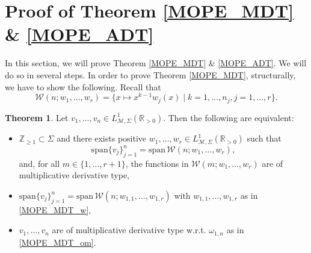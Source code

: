 \documentclass[a4paper,12pt,oneside]{article}
\theoremstyle{definition}
\newtheorem{thm}[defi]{Theorem}
\newcommand{\Z}{\mathbb{Z}}
\newcommand{\C}{\mathbb{C}}
\newcommand{\R}{\mathbb{R}}
\newcommand{\om}{\omega}
\newcommand{\spn}[1]{\text{span}\{#1\}}
\newcommand{\MT}[1]{\mathcal{M}#1}
\begin{document}
\section{Proof of Theorem \ref{MOPE_MDT} \& \ref{MOPE_ADT}} 

In this section, we will prove Theorem \ref{MOPE_MDT} \& \ref{MOPE_ADT}. We will do so in several steps. In order to prove Theorem \ref{MOPE_MDT}, structurally, we have to show the following. Recall that
    $$ \mathcal{W}(n;w_1,\dots,w_r) = \{ x\mapsto x^{k-1} w_j(x) \mid k=1,\dots,n_j,j=1,\dots,r \}.$$

\begin{thm} \label{MOPE_MDT_CORE}
    Let $v_1,\dots,v_n\in L^1_{\MT{},\Sigma}(\R_{>0})$. Then the following are equivalent:
    \begin{itemize}
        \item[$i)$] $\Z_{\geq 1}\subset\Sigma$ and there exists positive $w_1,\dots,w_r\in L^1_{\MT{},\Sigma}(\R_{>0})$ such that 
        $$\spn{v_j}_{j=1}^n=\text{span}\,\mathcal{W}(n;w_1,\dots,w_r),$$ 
        and, for all $m\in\{1,\dots,r+1\}$, the functions in $\mathcal{W}(m;w_1,\dots,w_r)$ are of multiplicative derivative type,
        \item[$ii)$] $\spn{v_j}_{j=1}^n=\text{span}\,\mathcal{W}(n;w_{1,1},\dots,w_{1,r})$ with $w_{1,1},\dots,w_{1,r}$ as in \eqref{MOPE_MDT_w},
        \item[$iii)$] $v_1,\dots,v_n$ are of multiplicative derivative type w.r.t. $\om_{1,n}$ as in \eqref{MOPE_MDT_om}.
    \end{itemize}
\end{thm}
\end{document}
